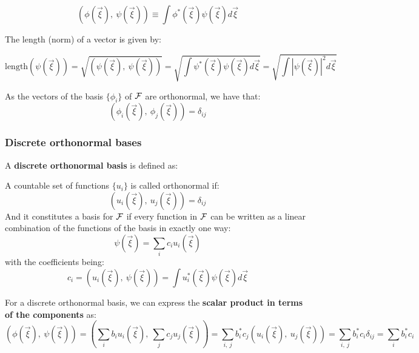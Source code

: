 \begin{equation}
    \left(\phi(\vec{\xi}), \ \psi(\vec{\xi})\right) \equiv \int\phi^*(\vec{\xi})\psi(\vec{\xi})d\vec{\xi}
\end{equation}

The length (norm) of a vector is given by:

\begin{equation}
    \text{length}\left(\psi(\vec{\xi})\right)=\sqrt{\left(\psi(\vec{\xi}), \ \psi(\vec{\xi})\right)} = \sqrt{\int\psi^*(\vec{\xi})\psi(\vec{\xi})d\vec{\xi}} = \sqrt{\int\left|\psi(\vec{\xi}) \right|^2d\vec{\xi}}
\end{equation}

As the vectors of the basis $\{\phi_i\}$ of $\mathcal{F}$ are orthonormal, we have that:
\begin{equation}
    \left(\phi_i(\vec{\xi}), \ \phi_j(\vec{\xi})\right) = \delta_{ij}
\end{equation}

\subsubsection{Discrete orthonormal bases}

A \textbf{discrete orthonormal basis} is defined as:

\begin{definition}
    A countable set of functions $\{u_i\}$ is called orthonormal if:
    \begin{equation}
        \left(u_i(\vec{\xi}), \ u_j(\vec{\xi})\right) = \delta_{ij}
    \end{equation}
    And it constitutes a basis for $\mathcal{F}$ if every function in $\mathcal{F}$ can be written as a linear combination of the functions of the basis in exactly one way:
    \begin{equation}
        \psi(\vec{\xi}) = \sum_i c_i u_i(\vec{\xi})
    \end{equation}
    with the coefficients being:
    \begin{equation}
        c_i = \left(u_i(\vec{\xi}), \ \psi(\vec{\xi})\right) = \int u_i^*(\vec{\xi})\psi(\vec{\xi})d\vec{\xi}
    \end{equation}    
\end{definition}

For a discrete orthonormal basis, we can express the \textbf{scalar product in terms of the components} as:
\begin{equation}
    \left(\phi(\vec{\xi}), \ \psi(\vec{\xi})\right) = \left(\sum_i b_iu_i(\vec{\xi}), \ \sum_j c_ju_j(\vec{\xi})\right) = \sum_{i, \ j} b^*_i c_j \left(u_i(\vec{\xi}), \ u_j(\vec{\xi})\right) = \sum_{i,\ j} b^*_i c_i\delta_{ij} = \sum_i b^*_i c_i
\end{equation}


